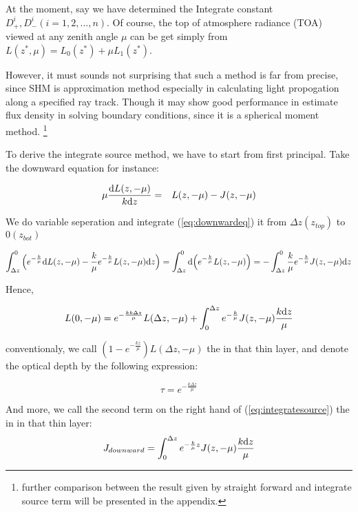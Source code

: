 At the moment, say we have determined the Integrate constant $D_{+}^{i}, D_{-}^{i}(i=1, 2, \ldots, n)$.
Of course, the top of atmosphere radiance (TOA) viewed at any zenith angle $\mu$ can be get simply from
$L(z^{*}, \mu) = L_{0}(z^{*}) + \mu L_{1}(z^{*})$.

However, it must sounds not surprising that such a method is far from precise, since SHM is approximation method
especially in calculating light propogation along a specified ray track. Though it may show good performance
in estimate flux density in solving boundary conditions, since it is a spherical moment method.
\footnote{further comparison between the result given by straight forward and 
integrate source term will be presented in the appendix.}

To derive the integrate source method, we have to start from first principal.
Take the downward equation for instance: 

\begin{eqnarray} \label{eq:downwardeq}
    \mu \frac{\mathrm{d} L(z, -\mu)}{k \mathrm{d} z} & = & 
    L(z, -\mu) - J(z, -\mu)
\end{eqnarray}

We do variable seperation and 
integrate (\ref{eq:downwardeq}) it from $\Delta z(z_{top})$ to $0 (z_{bot})$ 

\begin{displaymath}
\int_{\Delta z}^{0} \Big(
    e^{-\frac{k}{\mu}} \mathrm{d} L(z, -\mu) - \frac{k}{\mu}e^{-\frac{k}{\mu}}L(z, -\mu)\mathrm{d} z
    \Big) = 
\int_{\Delta z}^{0}\mathrm{d}\Big(
    e^{-\frac{k}{\mu}}L(z, -\mu)
    \Big) = 
-\int_{\Delta z}^{0}
    \frac{k}{\mu}e^{-\frac{k}{\mu}}J(z, -\mu)\mathrm{d} z
\end{displaymath}

Hence,

\begin{equation} \label{eq:integratesource}
    L(0, -\mu) = e^{-\frac{kk\Delta z}{\mu}}L(\Delta z, -\mu) + \int_{0}^{\Delta z}
    e^{-\frac{k}{\mu}}J(z, -\mu)\frac{k\mathrm{d} z}{\mu}
\end{equation}

conventionaly, we call $(1 - e^{-\frac{kz}{\mu}})L(\Delta z, -\mu)$ the  in that thin layer, and denote the optical depth by the following expression:

\begin{equation} \label{eq:tau}
    \tau = e^{-\frac{k\Delta z}{\mu}}
\end{equation}

And more, we call the second term on the right hand of (\ref{eq:integratesource}) the  in
in that thin layer: 
\begin{equation} \label{eq:jdo}
    J_{downward} = \int_{0}^{\Delta z}
    e^{-\frac{k}{\mu}z}J(z, -\mu)\frac{k\mathrm{d} z}{\mu}
\end{equation}

